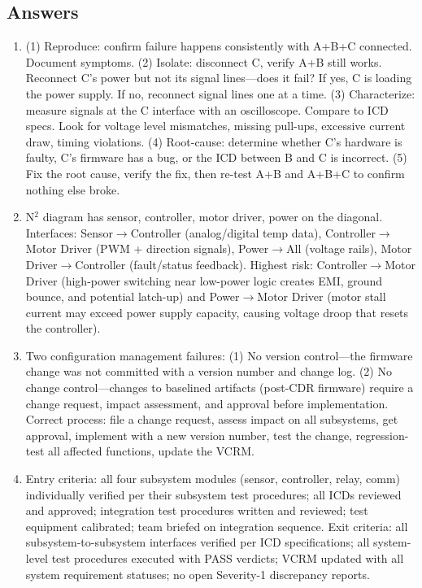 \documentclass[11pt,letterpaper,twoside,openany]{book}
\begin{document}
\subsection{Answers}
\begin{enumerate}[leftmargin=1.5em]
\item (1) Reproduce: confirm failure happens consistently with A+B+C connected. Document symptoms. (2) Isolate: disconnect C, verify A+B still works. Reconnect C's power but not its signal lines---does it fail? If yes, C is loading the power supply. If no, reconnect signal lines one at a time. (3) Characterize: measure signals at the C interface with an oscilloscope. Compare to ICD specs. Look for voltage level mismatches, missing pull-ups, excessive current draw, timing violations. (4) Root-cause: determine whether C's hardware is faulty, C's firmware has a bug, or the ICD between B and C is incorrect. (5) Fix the root cause, verify the fix, then re-test A+B and A+B+C to confirm nothing else broke.

\item N$^2$ diagram has sensor, controller, motor driver, power on the diagonal. Interfaces: Sensor$\to$Controller (analog/digital temp data), Controller$\to$Motor Driver (PWM + direction signals), Power$\to$All (voltage rails), Motor Driver$\to$Controller (fault/status feedback). Highest risk: Controller$\to$Motor Driver (high-power switching near low-power logic creates EMI, ground bounce, and potential latch-up) and Power$\to$Motor Driver (motor stall current may exceed power supply capacity, causing voltage droop that resets the controller).

\item Two configuration management failures: (1) No version control---the firmware change was not committed with a version number and change log. (2) No change control---changes to baselined artifacts (post-CDR firmware) require a change request, impact assessment, and approval before implementation. Correct process: file a change request, assess impact on all subsystems, get approval, implement with a new version number, test the change, regression-test all affected functions, update the VCRM.

\item Entry criteria: all four subsystem modules (sensor, controller, relay, comm) individually verified per their subsystem test procedures; all ICDs reviewed and approved; integration test procedures written and reviewed; test equipment calibrated; team briefed on integration sequence. Exit criteria: all subsystem-to-subsystem interfaces verified per ICD specifications; all system-level test procedures executed with PASS verdicts; VCRM updated with all system requirement statuses; no open Severity-1 discrepancy reports.


\end{enumerate}
\end{document}
